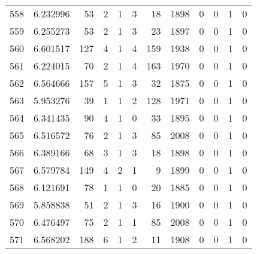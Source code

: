 \begin{tabular}{lrrrrrrrrrrr}
558 &  6.232996 &   53 &      2 &        1 &      3 &              18 &  1898 &               0 &               0 &               1 &               0 \\
559 &  6.255273 &   53 &      2 &        1 &      3 &              23 &  1897 &               0 &               0 &               1 &               0 \\
560 &  6.601517 &  127 &      4 &        1 &      4 &             159 &  1938 &               0 &               0 &               1 &               0 \\
561 &  6.224015 &   70 &      2 &        1 &      4 &             163 &  1970 &               0 &               0 &               1 &               0 \\
562 &  6.564666 &  157 &      5 &        1 &      3 &              32 &  1875 &               0 &               0 &               1 &               0 \\
563 &  5.953276 &   39 &      1 &        1 &      2 &             128 &  1971 &               0 &               0 &               1 &               0 \\
564 &  6.341435 &   90 &      4 &        1 &      0 &              33 &  1895 &               0 &               0 &               1 &               0 \\
565 &  6.516572 &   76 &      2 &        1 &      3 &              85 &  2008 &               0 &               0 &               1 &               0 \\
566 &  6.389166 &   68 &      3 &        1 &      3 &              18 &  1898 &               0 &               0 &               1 &               0 \\
567 &  6.579784 &  149 &      4 &        2 &      1 &               9 &  1899 &               0 &               0 &               1 &               0 \\
568 &  6.121691 &   78 &      1 &        1 &      0 &              20 &  1885 &               0 &               0 &               1 &               0 \\
569 &  5.858838 &   51 &      2 &        1 &      3 &              16 &  1900 &               0 &               0 &               1 &               0 \\
570 &  6.476497 &   75 &      2 &        1 &      1 &              85 &  2008 &               0 &               0 &               1 &               0 \\
571 &  6.568202 &  188 &      6 &        1 &      2 &              11 &  1908 &               0 &               0 &               1 &               0 \\

\end{tabular}
